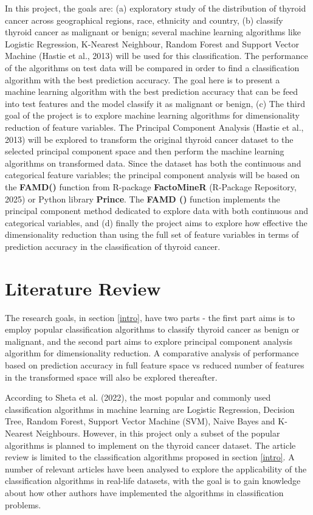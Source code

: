 \documentclass[11pt,a4paper]{article}
\begin{document}
In this project, the goals are: (a) exploratory study of the distribution of thyroid cancer across geographical regions, race, ethnicity and country, (b) classify thyroid cancer as malignant or benign; several machine learning algorithms like Logistic Regression, K-Nearest Neighbour, Random Forest and Support Vector Machine (Hastie et al., 2013) will be used for this classification. The performance of the algorithms on test data will be compared in order to find a classification algorithm with the best prediction accuracy. The goal here is to present a machine learning algorithm with the best prediction accuracy that can be feed into test features and the model classify it as malignant or benign, (c) The third goal of the project is to explore machine learning algorithms for dimensionality reduction of feature variables. The Principal Component Analysis (Hastie et al., 2013) will be explored to transform the original thyroid cancer dataset to the selected principal component space and then perform the machine learning algorithms on transformed data. Since the dataset has both the continuous and categorical feature variables; the principal component analysis will be based on the {\bf FAMD()} function from R-package {\bf FactoMineR} (R-Package Repository, 2025) or Python library {\bf Prince}. The {\bf FAMD ()} function implements the principal component method dedicated to explore data with both continuous and categorical variables, and (d) finally the project aims to explore how effective the dimensionality reduction than using the full set of feature variables in terms of prediction accuracy in the classification of thyroid cancer.

\section{Literature Review}
The research goals, in section \ref{intro}, have two parts - the first part aims is to employ popular classification algorithms to classify thyroid cancer as benign or malignant, and the second part aims to explore principal component analysis algorithm for dimensionality reduction. A comparative analysis of performance based on prediction accuracy in full feature space vs reduced number of features in the transformed space will also be explored thereafter.    

According to Sheta et al. (2022), the most popular and commonly used classification algorithms in machine learning are Logistic Regression, Decision Tree, Random Forest, Support Vector Machine (SVM), Naive Bayes and K-Nearest Neighbours. However, in this project only a subset of the popular algorithms is planned to implement on the thyroid cancer dataset. The article review is limited to the classification algorithms proposed in section \ref{intro}. A number of relevant articles have been analysed to explore the applicability of the classification algorithms in real-life datasets, with the goal is to gain knowledge about how other authors have implemented the algorithms in classification problems.  
\end{document}
